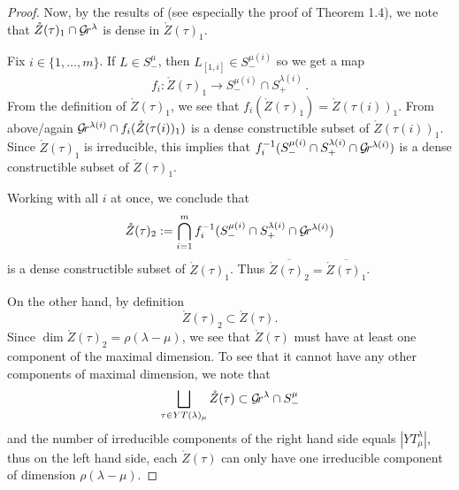 \documentclass{article} %
\begin{document}
\begin{proof}
Now, by the results of \cite{kamnitzerfibreshives} (see especially the proof of Theorem 1.4), we note that $\mathring Z(\tau)_1\cap \mathcal{G}\!r^\lambda$ is dense in $ \mathring Z(\tau)_1$. 

Fix $ i \in \{1, \dots, m\}$. If $ L \in S^\mu_-$, then $ L_{[1,i]} \in S^{\mu(i)}_-$ so we get a map 
$$ 
f_i : \mathring Z(\tau)_1 \rightarrow S^{\mu(i)}_- \cap S_+^{\lambda(i)} \,. 
$$
From the definition of $ \mathring Z(\tau)_1 $, we see that $ f_i(\mathring Z(\tau)_1 )= \mathring Z(\tau(i))_1$.  
From above/again $ \mathcal{G}\!r^{\lambda(i)} \cap f_i(\mathring Z(\tau(i))_1)$ is a dense constructible subset of $\mathring Z(\tau(i))_1$.  
Since $ \mathring Z(\tau)_1$ is irreducible, this implies that $ f_i^{-1}(S^{\mu(i)}_- \cap S_+^{\lambda(i)} \cap \mathcal{G}\!r^{\lambda(i)}) $ 
is a dense constructible subset of $ \mathring Z(\tau)_1 $.  

Working with all $ i $ at once, we conclude that
$$ 
\mathring Z(\tau)_2 := \bigcap_{i=1}^m f_i^{-1}(S^{\mu(i)}_- \cap S_+^{\lambda(i)} \cap \mathcal{G}\!r^{\lambda(i)}) 
$$
is a dense constructible subset of $\mathring Z(\tau)_1$. 
Thus $\overline{\mathring Z(\tau)_2} = \overline{\mathring Z(\tau)_1}$.

On the other hand, by definition 
$$
\mathring Z(\tau)_2 \subset \mathring Z(\tau). %
$$
Since $ \dim \mathring Z(\tau)_2 = \rho(\lambda - \mu)$, we see that $ \mathring Z(\tau) $ must have at least one component of the maximal dimension.  To see that it cannot have any other components of maximal dimension, we note that
$$ \bigsqcup_{\tau \in YT(\lambda)_\mu} \mathring Z(\tau) \subset \mathcal{G}\!r^\lambda \cap S_-^\mu$$
and the number of irreducible components of the right hand side 
equals $|YT^\lambda_\mu|$, thus on the left hand side, each $ \mathring Z(\tau)$ can only have one irreducible component of dimension $ \rho(\lambda - \mu)$.


\end{proof}
\end{document}
